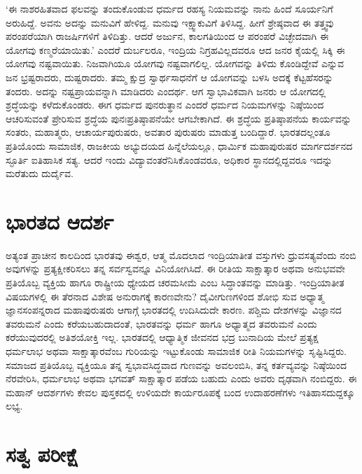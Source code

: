 ‘ಈ ನಾಶರಹಿತವಾದ ಫಲವನ್ನು ತಂದುಕೊಂಡುವ ಧರ್ಮದ ರಹಸ್ಯ ನಿಯಮವನ್ನು ನಾನು ಹಿಂದೆ ಸೂರ್ಯನಿಗೆ ಅರುಹಿದ್ದೆ. ಅವನು ಅದನ್ನು ಮನುವಿಗೆ ಹೇಳಿದ್ದ. ಮನುವು ಇಕ್ಷ್ವಾಕುವಿಗೆ ತಿಳಿಸಿದ್ದ. ಹೀಗೆ ಶ್ರೇಷ್ಠವಾದ ಈ ತತ್ತ್ವವು ಪರಂಪರೆಯಾಗಿ ರಾಜರ್ಷಿಗಳಿಗೆ ತಿಳಿದಿತ್ತು. ಆದರೆ ಅರ್ಜುನ, ಕಾಲಗತಿಯಿಂದ ಆ ಪರಂಪರೆ ವಿಚ್ಛೇದವಾಗಿ ಈ ಯೋಗವು ಕಣ್ಮರೆಯಾಯಿತು.’ ಎಂದರೆ ದುರ್ಬಲರೂ, ಇಂದ್ರಿಯ ನಿಗ್ರಹವಿಲ್ಲದವರೂ ಆದ ಜನರ ಕೈಯಲ್ಲಿ ಸಿಕ್ಕಿ ಈ ಯೋಗವು ನಷ್ಟವಾಯಿತು. ನಿಜವಾಗಿಯೂ ಯೋಗವು ನಷ್ಟವಾಗಲಿಲ್ಲ. ಯೋಗವನ್ನು ತಿಳಿದು ಕೊಂಡಿದ್ದೇವೆ ಎನ್ನುವ ಜನ ಭ್ರಷ್ಟರಾದರು, ದುಷ್ಟರಾದರು. ತಮ್ಮ ಕ್ಷುದ್ರ ಸ್ವಾರ್ಥಸಾಧನೆಗೆ ಆ ಯೋಗವನ್ನು ಬಳಸಿ ಅದಕ್ಕೆ ಕೆಟ್ಟಹೆಸರನ್ನು ತಂದರು. ಅದನ್ನು ನಷ್ಟಪ್ರಾಯವನ್ನಾಗಿ ಮಾಡಿದರು ಎಂದರ್ಥ. ಆಗ ಸ್ವಾಭಾವಿಕವಾಗಿ ಜನರು ಆ ಯೋಗದಲ್ಲಿ ಶ್ರದ್ಧೆಯನ್ನು ಕಳೆದುಕೊಂಡರು. ಈಗ ಧರ್ಮದ ಪುನರುತ್ಥಾನ ಎಂದರೆ ಧರ್ಮದ ನಿಯಮಗಳನ್ನು ನಿಷ್ಠೆಯಿಂದ ಆಚರಿಸುವಂತೆ ಪ್ರೇರಿಸುವ ಶ್ರದ್ಧೆಯ ಪುನಃಪ್ರತಿಷ್ಠಾಪನೆಯೇ ಆಗಬೇಕಾಗಿದೆ. ಈ ಶ್ರದ್ಧೆಯ ಪ್ರತಿಷ್ಠಾಪನೆಯ ಕಾರ್ಯವನ್ನು ಸಂತರು, ಮಹಾತ್ಮರು, ಆಚಾರ್ಯಪುರುಷರು, ಅವತಾರ ಪುರುಷರು ಮಾಡುತ್ತ ಬಂದಿದ್ದಾರೆ. ಭಾರತದಲ್ಲಂತೂ ಪ್ರತಿಯೊಂದು ಸಾಮಾಜಿಕ, ರಾಜಕೀಯ ಅಭ್ಯುದಯದ ಹಿನ್ನೆಲೆಯಲ್ಲೂ, ಧಾರ್ಮಿಕ ಮಹಾಪುರುಷರ ಮಾರ್ಗದರ್ಶನದ ಸ್ಫೂರ್ತಿ ಐತಿಹಾಸಿಕ ಸತ್ಯ. ಆದರೆ ಇಂದು ವಿದ್ಯಾವಂತರೆನಿಸಿಕೊಂಡವರೂ, ಅಧಿಕಾರ ಸ್ಥಾನದಲ್ಲಿದ್ದವರೂ ಇದನ್ನು ಮರೆತುದು ದುರ್ದೈವ.

\medskip


\section*{ಭಾರತದ ಆದರ್ಶ}


ಅತ್ಯಂತ ಪ್ರಾಚೀನ ಕಾಲದಿಂದ ಭಾರತವು ಈಶ್ವರ, ಆತ್ಮ ಮೊದಲಾದ ಇಂದ್ರಿಯಾತೀತ ವಸ್ತುಗಳು ಧ್ರುವಸತ್ಯವೆಂದು ನಂಬಿ ಅವುಗಳನ್ನು ಪ್ರತ್ಯಕ್ಷೀಕರಿಸಲು ತನ್ನ ಸರ್ವಸ್ವವನ್ನೂ ವಿನಿಯೋಗಿಸಿದೆ. ಈ ರೀತಿಯ ಸಾಕ್ಷಾತ್ಕಾರ ಅಥವಾ ಅನುಭವವೇ ಪ್ರತಿಯೊಬ್ಬ ವ್ಯಕ್ತಿಯ ಹಾಗೂ ರಾಷ್ಟ್ರೀಯ ಧ್ಯೇಯದ ಚರಮಸೀಮೆ ಎಂಬ ಸಿದ್ಧಾಂತವನ್ನು ಮಾಡಿತ್ತು. ಇಂದ್ರಿಯಾತೀತ ವಿಷಯಗಳಲ್ಲಿ ಈ ತೆರನಾದ ವಿಶೇಷ ಅನುರಾಗಕ್ಕೆ ಕಾರಣವೇನು? ದೈವೀಗುಣಗಳಿಂದ ಶೋಭಿ ಸುವ ಅಧ್ಯಾತ್ಮ ಜ್ಞಾನಸಂಪನ್ನರಾದ ಮಹಾಪುರುಷರು ಆಗಾಗ್ಗೆ ಭಾರತದಲ್ಲಿ ಉದಿಸಿದುದೇ ಕಾರಣ. ಪಶ್ಚಿಮ ದೇಶಗಳನ್ನು ವಿಜ್ಞಾನದ ತವರುಮನೆ ಎಂದು ಕರೆಯಬಹುದಾದಂತೆ, ಭಾರತವನ್ನು ಧರ್ಮ ಹಾಗೂ ಅಧ್ಯಾತ್ಮದ ತವರುಮನೆ ಎಂದು ಕರೆಯುವುದರಲ್ಲಿ ಅತಿಶಯೋಕ್ತಿ ಇಲ್ಲ. ಭಾರತದಲ್ಲಿ ಆಧ್ಯಾತ್ಮಿಕ ಜೀವನದ ಭದ್ರ ಬುನಾದಿಯ ಮೇಲೆ ಪ್ರತ್ಯಕ್ಷ ಧರ್ಮಲಾಭ ಅಥವಾ ಸಾಕ್ಷಾತ್ಕಾರವೆಂಬ ಗುರಿಯನ್ನು ಇಟ್ಟುಕೊಂಡು ಸಾಮಾಜಿಕ ರೀತಿ ನಿಯಮಗಳನ್ನು ಸೃಷ್ಟಿಸಿದ್ದರು. ಸಮಾಜದ ಪ್ರತಿಯೊಬ್ಬ ವ್ಯಕ್ತಿಯೂ ತನ್ನ ಸ್ವಭಾವಸಿದ್ಧವಾದ ಗುಣವನ್ನು ಅವಲಂಬಿಸಿ, ತನ್ನ ಕರ್ತವ್ಯವನ್ನು ನಿಷ್ಠೆಯಿಂದ ನೆರವೇರಿಸಿ, ಧರ್ಮಲಾಭ ಅಥವಾ ಭಗವತ್ ಸಾಕ್ಷಾತ್ಕಾರ ಪಡೆಯ ಬಹುದು ಎಂದು ಅವರು ದೃಢವಾಗಿ ನಂಬಿದ್ದರು. ಈ ಮಹಾನ್ ಆದರ್ಶಗಳು ಕೇವಲ ಪುಸ್ತಕದಲ್ಲಿ ಉಳಿಯದೇ ಕಾರ್ಯರೂಪಕ್ಕೆ ಬಂದ ಉದಾಹರಣೆಗಳು ಇತಿಹಾಸದುದ್ದಕ್ಕೂ ಲಭ್ಯ.


\section*{ಸತ್ವ ಪರೀಕ್ಷೆ}

